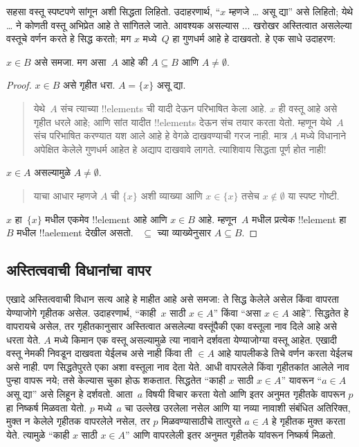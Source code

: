 \documentclass[../../../include/open-logic-section]{subfiles}
\begin{document}
सहसा वस्तू स्पष्टपणे सांगून अशी सिद्धता लिहितो. उदाहरणार्थ, “$x$ म्हणजे \dots{} असू द्या” असे लिहितो; येथे \dots{} ने कोणती वस्तू अभिप्रेत आहे ते सांगितले जाते. आवश्यक असल्यास $\dots$ खरोखर अस्तित्वात असलेल्या वस्तूचे वर्णन करते हे सिद्ध करतो; मग $x$ मध्ये~$Q$ हा गुणधर्म आहे हे दाखवतो. हे एक साधे उदाहरण:

\begin{prop}
$x \in B$ असे समजा. मग असा~$A$ आहे की $A \subseteq B$ आणि $A \neq \emptyset$.
\end{prop}

\begin{proof}
$x \in B$ असे गृहीत धरा. $A = \{x\}$ असू द्या.
\begin{quote}
येथे~$A$ संच त्याच्या !!{element}s ची यादी देऊन परिभाषित केला आहे. $x$ ही वस्तू आहे असे गृहीत धरले आहे; आणि सांत यादीत !!{element}s देऊन संच तयार करता येतो. म्हणून येथे~$A$ संच परिभाषित करण्यात यश आले आहे हे वेगळे दाखवण्याची गरज नाही. मात्र $A$ मध्ये विधानाने अपेक्षित केलेले गुणधर्म आहेत हे अद्याप दाखवावे लागते. त्याशिवाय सिद्धता पूर्ण होत नाही!{}
\end{quote}
$x \in A$ असल्यामुळे $A \neq \emptyset$.
\begin{quote}
याचा आधार म्हणजे $A$ ची $\{x\}$ अशी व्याख्या आणि $x \in \{x\}$ तसेच $x \notin \emptyset$ या स्पष्ट गोष्टी.
\end{quote}
$x$ हा~$\{x\}$ मधील एकमेव !!{element} आहे आणि $x \in B$ आहे. म्हणून~$A$ मधील प्रत्येक !!{element} हा~$B$ मधील !!a{element} देखील असतो. ~$ \subseteq$ च्या व्याख्येनुसार $A \subseteq B$.
\end{proof}

\subsection{अस्तित्ववाची विधानांचा वापर}

एखादे अस्तित्ववाची विधान सत्य आहे हे माहीत आहे असे समजा: ते सिद्ध केलेले असेल किंवा वापरता येण्याजोगे गृहीतक असेल. उदाहरणार्थ, “काही~$x$ साठी $x \in A$” किंवा “असा $x \in A$ आहे”. सिद्धतेत हे वापरायचे असेल, तर गृहीतकानुसार अस्तित्वात असलेल्या वस्तूंपैकी एका वस्तूला नाव दिले आहे असे धरता येते. $A$ मध्ये किमान एक वस्तू असल्यामुळे त्या नावाने दर्शवता येण्याजोग्या वस्तू आहेत. एखादी वस्तू नेमकी निवडून दाखवता येईलच असे नाही किंवा ती $\in A$ आहे यापलीकडे तिचे वर्णन करता येईलच असे नाही. पण सिद्धतेपुरते एका अशा वस्तूला नाव देता येते. आधी वापरलेले किंवा गृहीतकांत आलेले नाव पुन्हा वापरू नये; तसे केल्यास चुका होऊ शकतात. सिद्धतेत “काही $x$ साठी $x \in A$” यावरून “$a \in A$ असू द्या” असे लिहून हे दर्शवतो. आता~$a$ विषयी विचार करता येतो आणि इतर अनुमत गृहीतके वापरून $p$ हा निष्कर्ष मिळवता येतो. $p$ मध्ये~$a$ चा उल्लेख उरलेला नसेल आणि या नव्या नावाशी संबंधित अतिरिक्त, मुक्त न केलेले गृहीतक वापरलेले नसेल, तर $p$ मिळवण्यासाठीचे तात्पुरते $a \in A$ हे गृहीतक मुक्त करता येते. त्यामुळे “काही $x$ साठी $x \in A$” आणि वापरलेली इतर अनुमत गृहीतके यांवरून निष्कर्ष मिळतो.
\end{document}
